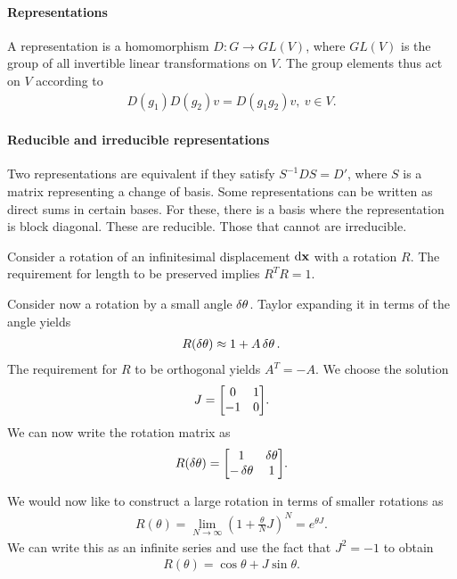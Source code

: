 \paragraph{Representations}
A representation is a homomorphism $D: G\to GL(V)$, where $GL(V)$ is the group of all invertible linear transformations on $V$. The group elements thus act on $V$ according to
\begin{align*}
D(g_{1})D(g_{2})v = D(g_{1}g_{2})v,\ v\in V.
\end{align*}

\paragraph{Reducible and irreducible representations}
Two representations are equivalent if they satisfy $S^{-1}DS = D'$, where $S$ is a matrix representing a change of basis. Some representations can be written as direct sums in certain bases. For these, there is a basis where the representation is block diagonal. These are reducible. Those that cannot are irreducible.

Consider a rotation of an infinitesimal displacement $\dd{\vb{x}}$ with a rotation $R$. The requirement for length to be preserved implies $R^{T}R = 1$.

Consider now a rotation by a small angle $\var{\theta}$. Taylor expanding it in terms of the angle yields
\begin{align*}
R(\var{\theta}) \approx 1 + A\var{\theta}.
\end{align*}
The requirement for $R$ to be orthogonal yields $A^{T} = -A$. We choose the solution
\begin{align*}
J =
\mqty[
0  & 1 \\
-1 & 0
].
\end{align*}
We can now write the rotation matrix as
\begin{align*}
R(\var{\theta}) =
\mqty[
1             & \var{\theta} \\
-\var{\theta} & 1
].
\end{align*}

We would now like to construct a large rotation in terms of smaller rotations as
\begin{align*}
R(\theta) = \lim\limits_{N\to\infty}\left(1 + \frac{\theta}{N}J\right)^{N} = e^{\theta J}.
\end{align*}
We can write this as an infinite series and use the fact that $J^{2} = -1$ to obtain
\begin{align*}
R(\theta) = \cos{\theta} + J\sin{\theta}.
\end{align*}

